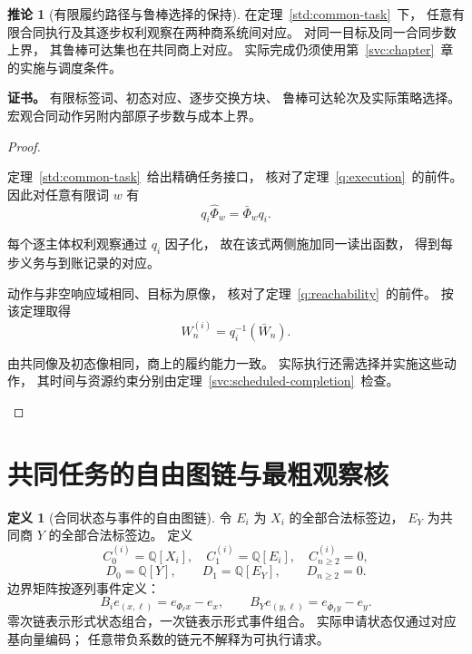 \documentclass[UTF8,12pt,a4paper,openany,fontset=none,zihao=false]{ctexrep}
\theoremstyle{definition}
\newtheorem{definition}{定义}[chapter]
\newtheorem{corollary}{推论}[chapter]
\newenvironment{certificate}{\par\noindent\textbf{证书。}\ignorespaces}{\par}
\newcommand{\1}{\mathbf 1}
\begin{document}
\begin{corollary}[有限履约路径与鲁棒选择的保持]
\label{std:task-consequences}
在定理~\ref{std:common-task}~下，
任意有限合同执行及其逐步权利观察在两种商系统间对应。
对同一目标及同一合同步数上界，
其鲁棒可达集也在共同商上对应。
实际完成仍须使用第~\ref{svc:chapter}~章的实施与调度条件。
\end{corollary}
\begin{certificate}
有限标签词、初态对应、逐步交换方块、
鲁棒可达轮次及实际策略选择。
宏观合同动作另附内部原子步数与成本上界。
\end{certificate}
\begin{proof}
\begin{semanticsteps}
\item 定理~\ref{std:common-task}~给出精确任务接口，
核对了定理~\ref{q:execution}~的前件。
因此对任意有限词 \(w\) 有
\[
q_i\widehat\Phi_w=\bar\Phi_wq_i.
\]
\item 每个逐主体权利观察通过 \(q_i\) 因子化，
故在该式两侧施加同一读出函数，
得到每步义务与到账记录的对应。
\item 动作与非空响应域相同、目标为原像，
核对了定理~\ref{q:reachability}~的前件。
按该定理取得
\[
W_n^{(i)}=q_i^{-1}(\bar W_n).
\]
\item 由共同像及初态像相同，商上的履约能力一致。
实际执行还需选择并实施这些动作，
其时间与资源约束分别由定理~\ref{svc:scheduled-completion}~检查。
\end{semanticsteps}
\end{proof}

\section{共同任务的自由图链与最粗观察核}

\begin{definition}[合同状态与事件的自由图链]
\label{std:graph}
令 \(E_i\) 为 \(X_i\) 的全部合法标签边，
\(E_Y\) 为共同商 \(Y\) 的全部合法标签边。
定义
\[
C^{(i)}_0=\mathbb Q[X_i],\quad
C^{(i)}_1=\mathbb Q[E_i],\quad
C^{(i)}_{n\ge2}=0,
\]
\[
D_0=\mathbb Q[Y],\qquad
D_1=\mathbb Q[E_Y],\qquad D_{n\ge2}=0.
\]
边界矩阵按逐列事件定义：
\[
B_ie_{(x,\ell)}
=e_{\Phi_\ell x}-e_x,\qquad
B_Ye_{(y,\ell)}
=e_{\bar\Phi_\ell y}-e_y.
\]
零次链表示形式状态组合，一次链表示形式事件组合。
实际申请状态仅通过对应基向量编码；
任意带负系数的链元不解释为可执行请求。
\end{definition}
\end{document}
